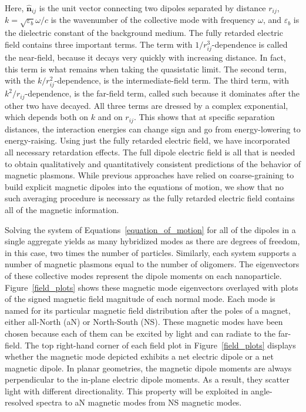 \documentclass[journal=apchd5,manuscript=article]{achemso}
\begin{document}
\noindent Here, $\hat{\textbf{n}}_{ij}$ is the unit vector connecting two dipoles separated by distance $r_{ij}$, $k=\sqrt{\varepsilon_b}\omega/c$ is the wavenumber of the collective mode with frequency $\omega$, and $\varepsilon_b$ is the dielectric constant of the background medium. The fully retarded electric field contains three important terms. The term with $1/r_{ij}^3$-dependence is called the near-field, because it decays very quickly with increasing distance. In fact, this term is what remains when taking the quasistatic limit. The second term, with the $k/r_{ij}^2$-dependence, is the intermediate-field term. The third term, with $k^2/r_{ij}$-dependence, is the far-field term, called such because it dominates after the other two have decayed. All three terms are dressed by a complex exponential, which depends both on $k$ and on $r_{ij}$. This shows that at specific separation distances, the interaction energies can change sign and go from energy-lowering to energy-raising. Using just the fully retarded electric field, we have incorporated all necessary retardation effects\cite{Purcell1973}. The full dipole electric field is all that is needed to obtain qualitatively and quantitatively consistent predictions of the behavior of magnetic plasmons. While previous approaches have relied on coarse-graining to build explicit magnetic dipoles into the equations of motion, we show that no such averaging procedure is necessary as the fully retarded electric field contains all of the magnetic information.

Solving the system of Equations~\ref{equation_of_motion} for all of the dipoles in a single aggregate yields as many hybridized modes as there are degrees of freedom, in this case, two times the number of particles. Similarly, each system supports a number of magnetic plasmons equal to the number of oligomers. The eigenvectors of these collective modes represent the dipole moments on each nanoparticle. Figure~\ref{field_plots} shows these magnetic mode eigenvectors overlayed with plots of the signed magnetic field magnitude of each normal mode. Each mode is named for its particular magnetic field distribution after the poles of a magnet, either all-North (aN) or North-South (NS). These magnetic modes have been chosen because each of them can be excited by light and can radiate to the far-field. The top right-hand corner of each field plot in Figure~\ref{field_plots} displays whether the magnetic mode depicted exhibits a net electric dipole or a net magnetic dipole. In planar geometries, the magnetic dipole moments are always perpendicular to the in-plane electric dipole moments. As a result, they scatter light with different directionality. This property will be exploited in angle-resolved spectra to aN magnetic modes from NS magnetic modes.
\end{document}
